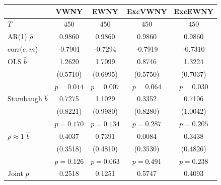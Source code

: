 \begin{tabular}{lcccc}
\toprule
 & VWNY & EWNY & ExcVWNY & ExcEWNY \\
\midrule
$T$ & 450 & 450 & 450 & 450 \\
AR(1) $\hat\rho$ & 0.9860 & 0.9860 & 0.9860 & 0.9860 \\
corr($e,m$) & -0.7901 & -0.7294 & -0.7919 & -0.7310 \\
\midrule
OLS $\hat b$ & 1.2620 & 1.7099 & 0.8746 & 1.3224 \\
 & (0.5710) & (0.6995) & (0.5750) & (0.7037) \\
 & $p=0.014$ & $p=0.007$ & $p=0.064$ & $p=0.030$ \\
Stambaugh $\hat b$ & 0.7275 & 1.1029 & 0.3352 & 0.7106 \\
 & (0.8221) & (0.9980) & (0.8280) & (1.0042) \\
 & $p=0.170$ & $p=0.134$ & $p=0.287$ & $p=0.205$ \\
$\rho\approx1$ $\hat b$ & 0.4037 & 0.7391 & 0.0084 & 0.3438 \\
 & (0.3518) & (0.4810) & (0.3530) & (0.4826) \\
 & $p=0.126$ & $p=0.063$ & $p=0.491$ & $p=0.238$ \\
\midrule
Joint $p$ & 0.2518 & 0.1251 & 0.5747 & 0.4093 \\
\bottomrule
\end{tabular}
